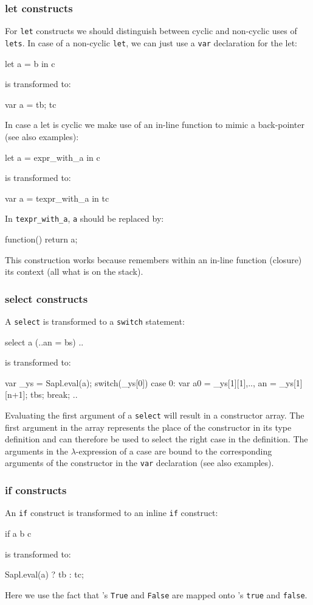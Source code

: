 \subsubsection{\textsf{let} constructs} 
For \texttt{let} constructs we should distinguish between cyclic and non-cyclic uses of \texttt{lets}.
In case of a non-cyclic \texttt{let}, we can just use a \texttt{var} declaration for the let:
\begin{CleanCode}
let a = b in c
\end{CleanCode}
is transformed to:
\begin{CleanCode}
var a = tb; tc
\end{CleanCode}
In case a let is cyclic we make use of an in-line \JS function to mimic a back-pointer (see also examples):
\begin{CleanCode}
let a = expr_with_a in c
\end{CleanCode}
is transformed to:
\begin{CleanCode}
var a = texpr_with_a in tc
\end{CleanCode}
In \texttt{texpr\_with\_a}, \texttt{a} should be replaced by: 
\begin{CleanCode}
function() {return a;}
\end{CleanCode}
This construction works because \JS remembers within an in-line function (closure) its context (all what is on the stack).

\subsubsection{\textsf{select} constructs} 
A \texttt{select} is transformed to a \texttt{switch} statement:
\begin{CleanCode}
select a (..an = bs) ..
\end{CleanCode}
is transformed to:
\begin{CleanCode}
var _ys = Sapl.eval(a);
switch(_ys[0]) {
	case 0: var a0 = _ys[1][1],..,  an = _ys[1][n+1];
	        tbs;
            break;
	..
}
\end{CleanCode}
Evaluating the first argument of a \texttt{select} will result in a constructor array. 
The first argument in the array represents the place of the constructor in its type definition
and can therefore be used to select the right case in the definition.
The arguments in the $\lambda$-expression of a case are bound to the corresponding
arguments of the constructor in the \texttt{var} declaration (see also examples).

\subsubsection{\textsf{if} constructs} 
An \texttt{if} construct is transformed to an inline \JS \texttt{if} construct:
\begin{CleanCode}
if a b c
\end{CleanCode}
is transformed to:
\begin{CleanCode}
Sapl.eval(a) ? tb : tc;
\end{CleanCode}
Here we use the fact that \Sapl's \texttt{True} and \texttt{False} are mapped onto \JS's \texttt{true} and \texttt{false}.

